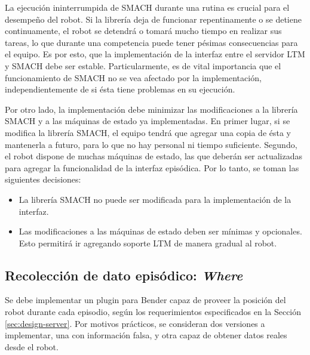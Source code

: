 La ejecución ininterrumpida de SMACH durante una rutina es crucial para el desempeño del robot. Si la librería deja de funcionar repentinamente o se detiene continuamente, el robot se detendrá o tomará mucho tiempo en realizar sus tareas, lo que durante una competencia puede tener pésimas consecuencias para el equipo. Es por esto, que la implementación de la interfaz entre el servidor LTM y SMACH debe ser estable. Particularmente, es de vital importancia que el funcionamiento de SMACH no se vea afectado por la implementación, independientemente de si ésta tiene problemas en su ejecución. 

Por otro lado, la implementación debe minimizar las modificaciones a la librería SMACH y a las máquinas de estado ya implementadas. En primer lugar, si se modifica la librería SMACH, el equipo tendrá que agregar una copia de ésta y mantenerla a futuro, para lo que no hay personal ni tiempo suficiente. Segundo, el robot dispone de muchas máquinas de estado, las que deberán ser actualizadas para agregar la funcionalidad de la interfaz episódica. Por lo tanto, se toman las siguientes decisiones:
\begin{itemize}
\item La librería SMACH no puede ser modificada para la implementación de la interfaz.
\item Las modificaciones a las máquinas de estado deben ser mínimas y opcionales. Esto permitirá ir agregando soporte LTM de manera gradual al robot.
\end{itemize}


\subsection{Recolección de dato episódico: \textit{Where}}

Se debe implementar un plugin para Bender capaz de proveer la posición del robot durante cada episodio, según los requerimientos especificados en la Sección  \ref{sec:design-server}. Por motivos prácticos, se consideran dos versiones a implementar, una con información falsa, y otra capaz de obtener datos reales desde el robot.

